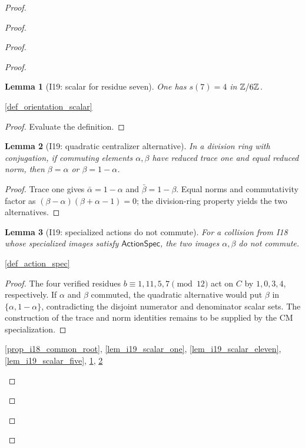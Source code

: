 \documentclass[11pt,a4paper]{article}
\numberwithin{equation}{section}
\theoremstyle{plain}\newtheorem{theorem}{Theorem}[section]\newaliascnt{proposition}{theorem}\newtheorem{proposition}[proposition]{Proposition}\aliascntresetthe{proposition}\newaliascnt{lemma}{theorem}\newtheorem{lemma}[lemma]{Lemma}\aliascntresetthe{lemma}
\theoremstyle{definition}\newaliascnt{definition}{theorem}\newtheorem{definition}[definition]{Definition}\aliascntresetthe{definition}\newaliascnt{notation}{theorem}\newtheorem{notation}[notation]{Notation}\aliascntresetthe{notation}
\providecommand{\lean}[1]{}\providecommand{\leanok}{}
\begin{document}
\begin{proof}
\begin{proof}
\begin{proof}
\begin{proof}
\begin{lemma}[I19: scalar for residue seven]\label{lem_i19_scalar_seven}\lean{SptCM.Repair.orientationScalar_seven}\leanok
One has $s(7)=4$ in $\mathbb Z/6\mathbb Z$.
\end{lemma}
\begin{uses-statement}\ref{def_orientation_scalar}\end{uses-statement}
\begin{proof}Evaluate the definition.\end{proof}

\begin{lemma}[I19: quadratic centralizer alternative]\label{lem_i19_centralizer_alternative}\lean{SptCM.Repair.centralizer_alternative_of_trace_one_norm_eq}\leanok
In a division ring with conjugation, if commuting elements $\alpha,\beta$ have reduced trace one and equal reduced norm, then $\beta=\alpha$ or $\beta=1-\alpha$.
\end{lemma}
\begin{proof}
Trace one gives $\bar\alpha=1-\alpha$ and $\bar\beta=1-\beta$.  Equal norms and commutativity factor as
$(\beta-\alpha)(\beta+\alpha-1)=0$; the division-ring property yields the two alternatives.
\end{proof}

\begin{lemma}[I19: specialized actions do not commute]\label{lem_i19_noncommuting_actions}\lean{SptCM.Repair.specialized_actions_noncommute}\leanok
For a collision from I18 whose specialized images satisfy
$\mathsf{ActionSpec}$, the two images $\alpha,\beta$ do not commute.
\end{lemma}
\begin{uses-statement}\ref{def_action_spec}\end{uses-statement}
\begin{proof}
The four verified residues $b\equiv1,11,5,7\pmod{12}$ act on $C$ by $1,0,3,4$, respectively.  If $\alpha$ and $\beta$ commuted, the quadratic alternative would put $\beta$ in $\{\alpha,1-\alpha\}$, contradicting the disjoint numerator and denominator scalar sets.  The construction of the trace and norm identities remains to be supplied by the CM specialization.
\end{proof}
\begin{uses-proof}\ref{prop_i18_common_root}, \ref{lem_i19_scalar_one}, \ref{lem_i19_scalar_eleven}, \ref{lem_i19_scalar_five}, \ref{lem_i19_scalar_seven}, \ref{lem_i19_centralizer_alternative}\end{uses-proof}


\end{proof}
\end{proof}
\end{proof}
\end{proof}
\end{document}
